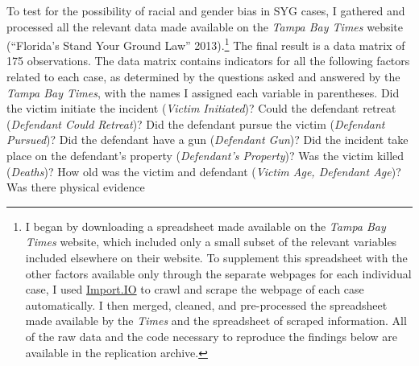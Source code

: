 \documentclass[12pt,article]{article}
\begin{document}
To test for the possibility of racial and gender bias in SYG cases, I
gathered and processed all the relevant data made available on the
\emph{Tampa Bay Times} website (``Florida's Stand Your Ground Law''
2013).\footnote{I began by downloading a spreadsheet made available on
  the \emph{Tampa Bay Times} website, which included only a small subset
  of the relevant variables included elsewhere on their website. To
  supplement this spreadsheet with the other factors available only
  through the separate webpages for each individual case, I used
  \href{http://import.io}{Import.IO} to crawl and scrape the webpage of
  each case automatically. I then merged, cleaned, and pre-processed the
  spreadsheet made available by the \emph{Times} and the spreadsheet of
  scraped information. All of the raw data and the code necessary to
  reproduce the findings below are available in the replication archive.}
The final result is a data matrix of 175 observations. The data matrix
contains indicators for all the following factors related to each case,
as determined by the questions asked and answered by the \emph{Tampa Bay
Times}, with the names I assigned each variable in parentheses. Did the
victim initiate the incident (\emph{Victim Initiated})? Could the defendant
retreat (\emph{Defendant Could Retreat})? Did the defendant pursue the victim
(\emph{Defendant Pursued})? Did the defendant have a gun (\emph{Defendant Gun})? Did
the incident take place on the defendant's property (\emph{Defendant's
Property})? Was the victim killed (\emph{Deaths})? How old was the victim and
defendant (\emph{Victim Age, Defendant Age})? Was there physical evidence
\end{document}
